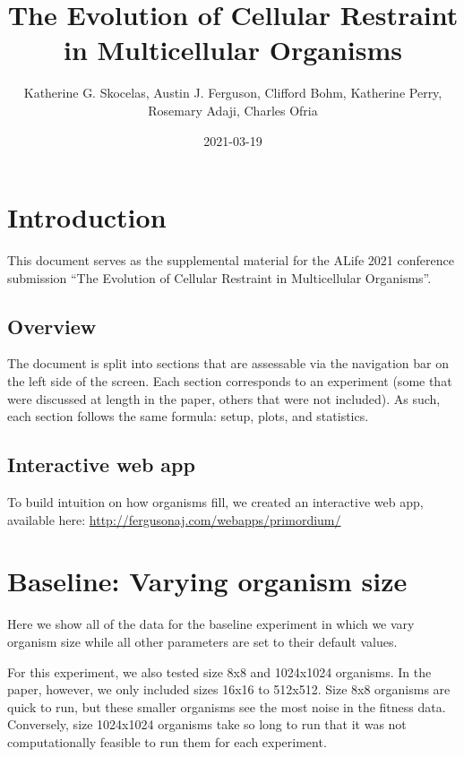 \documentclass[]{book}
\title{The Evolution of Cellular Restraint in Multicellular Organisms}
\author{Katherine G. Skocelas, Austin J. Ferguson, Clifford Bohm, Katherine Perry, Rosemary Adaji, Charles Ofria}
\date{2021-03-19}
\begin{document}
\maketitle

{
\setcounter{tocdepth}{1}
\tableofcontents
}
\hypertarget{introduction}{%
\chapter{Introduction}\label{introduction}}

This document serves as the supplemental material for the ALife 2021 conference submission ``The Evolution of Cellular Restraint in Multicellular Organisms''.

\hypertarget{overview}{%
\section{Overview}\label{overview}}

The document is split into sections that are assessable via the navigation bar on the left side of the screen.
Each section corresponds to an experiment (some that were discussed at length in the paper, others that were not included).
As such, each section follows the same formula: setup, plots, and statistics.

\hypertarget{interactive-web-app}{%
\section{Interactive web app}\label{interactive-web-app}}

To build intuition on how organisms fill, we created an interactive web app, available here: \url{http://fergusonaj.com/webapps/primordium/}

\hypertarget{baseline-varying-organism-size}{%
\chapter{Baseline: Varying organism size}\label{baseline-varying-organism-size}}

Here we show all of the data for the baseline experiment in which we vary organism size while all other parameters are set to their default values.

For this experiment, we also tested size 8x8 and 1024x1024 organisms.
In the paper, however, we only included sizes 16x16 to 512x512.
Size 8x8 organisms are quick to run, but these smaller organisms see the most noise in the fitness data.
Conversely, size 1024x1024 organisms take so long to run that it was not computationally feasible to run them for each experiment.
\end{document}
